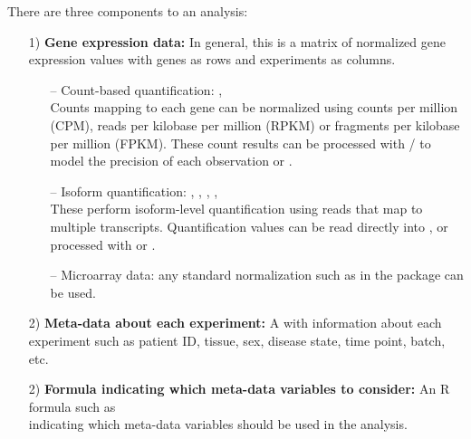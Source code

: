 \documentclass[12pt]{article}\usepackage[]{graphicx}\usepackage[]{xcolor}
\begin{document}
There are three components to an analysis: 
\begin{itemize}
 \item[1)] {\bf Gene expression data:}
 	In general, this is a matrix of normalized gene expression values with genes as rows and experiments as columns. \\

 	\begin{itemize}[align=left]
 		\item[-- Count-based quantification:]  \cite{Liao2014},  \cite{Anders2015}\\ 
 			Counts mapping to each gene can be normalized using counts per million (CPM), reads per kilobase per million (RPKM) or fragments per kilobase per million (FPKM).  These count results can be processed with / \cite{Law2014} to model the precision of each observation or  \cite{Love2014}.\\

 		\item[-- Isoform quantification:]  \cite{Bray2015},  \cite{Patro2014},  \cite{Patro2015},  \cite{Li2011f},  \cite{Trapnell2010}\\
 				These perform isoform-level quantification using reads that map to multiple transcripts.  Quantification values can be read directly into \R{}, or processed with  \cite{Frazee2015} or  \cite{Soneson2015}.\\
 		
 		\item[-- Microarray data:] any standard normalization such as  in the  \cite{oligoBioc} package can be used.    \\   
 	\end{itemize}

 \item[2)] {\bf Meta-data about each experiment:}  A  with information about each experiment such as patient ID, tissue, sex, disease state, time point, batch, etc.\\ 

 \item[2)] {\bf Formula indicating which meta-data variables to consider:} An R{} formula such as\\ 
 indicating which meta-data variables should be used in the analysis.
\end{itemize}
\end{document}
